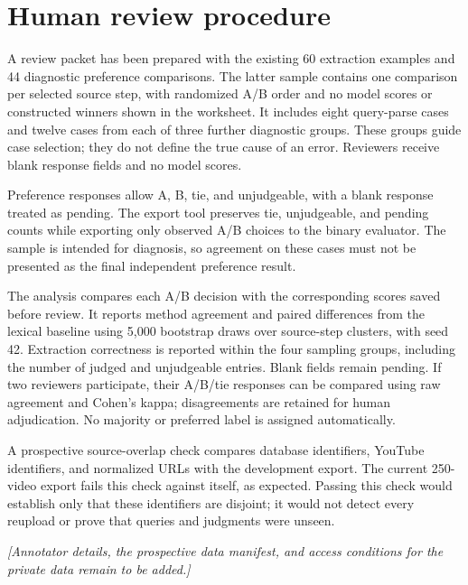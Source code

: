 \documentclass[11pt,letterpaper]{article}
\newcommand{\pending}[1]{\par\noindent\textit{[#1]}\par\vspace{0.6em}}
\begin{document}
\section{Human review procedure}
A review packet has been prepared with the existing 60 extraction examples
and 44 diagnostic preference comparisons. The latter sample contains one
comparison per selected source step, with randomized A/B order and no model
scores or constructed winners shown in the worksheet. It includes eight
query-parse cases and twelve cases from each of three further diagnostic
groups. These groups guide case selection; they do not define the true cause
of an error. Reviewers receive blank response fields and no model scores.

Preference responses allow A, B, tie, and unjudgeable, with a blank response
treated as pending. The export tool preserves tie, unjudgeable, and pending
counts while exporting only observed A/B choices to the binary evaluator.
The sample is intended for diagnosis, so agreement on these cases must not
be presented as the final independent preference result.

The analysis compares each A/B decision with the corresponding scores saved
before review. It reports method agreement and paired differences from the
lexical baseline using 5,000 bootstrap draws over source-step clusters, with
seed 42. Extraction correctness is reported within the four sampling groups,
including the number of judged and unjudgeable entries. Blank fields remain
pending. If two reviewers participate, their A/B/tie responses can be compared
using raw agreement and Cohen's kappa; disagreements are retained for human
adjudication. No majority or preferred label is assigned automatically.

A prospective source-overlap check compares database identifiers, YouTube
identifiers, and normalized URLs with the development export. The current
250-video export fails this check against itself, as expected. Passing this
check would establish only that these identifiers are disjoint; it would not
detect every reupload or prove that queries and judgments were unseen.

\pending{Annotator details, the prospective data manifest, and access conditions
for the private data remain to be added.}
\end{document}
